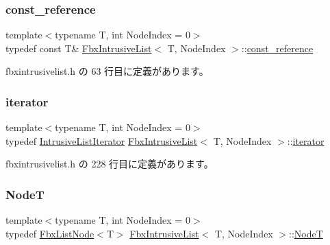 \subsubsection{\texorpdfstring{const\+\_\+reference}{const\_reference}}
{\footnotesize\ttfamily template$<$typename T, int Node\+Index = 0$>$ \\
typedef const T\& \hyperlink{class_fbx_intrusive_list}{Fbx\+Intrusive\+List}$<$ T, Node\+Index $>$\+::\hyperlink{class_fbx_intrusive_list_a21904cb72c0ccae9d5c0b9f171befeb8}{const\+\_\+reference}}



 fbxintrusivelist.\+h の 63 行目に定義があります。

\mbox{\label{class_fbx_intrusive_list_ae1012cd86e3ff0a4a49c982f0d34b4e7}} 
\subsubsection{\texorpdfstring{iterator}{iterator}}
{\footnotesize\ttfamily template$<$typename T, int Node\+Index = 0$>$ \\
typedef \hyperlink{class_fbx_intrusive_list_1_1_intrusive_list_iterator}{Intrusive\+List\+Iterator} \hyperlink{class_fbx_intrusive_list}{Fbx\+Intrusive\+List}$<$ T, Node\+Index $>$\+::\hyperlink{class_fbx_intrusive_list_ae1012cd86e3ff0a4a49c982f0d34b4e7}{iterator}}



 fbxintrusivelist.\+h の 228 行目に定義があります。

\mbox{\label{class_fbx_intrusive_list_a6ffda382a6d029a042cbb0110853680c}} 
\subsubsection{\texorpdfstring{NodeT}{NodeT}}
{\footnotesize\ttfamily template$<$typename T, int Node\+Index = 0$>$ \\
typedef \hyperlink{class_fbx_list_node}{Fbx\+List\+Node}$<$T$>$ \hyperlink{class_fbx_intrusive_list}{Fbx\+Intrusive\+List}$<$ T, Node\+Index $>$\+::\hyperlink{class_fbx_intrusive_list_a6ffda382a6d029a042cbb0110853680c}{NodeT}}



